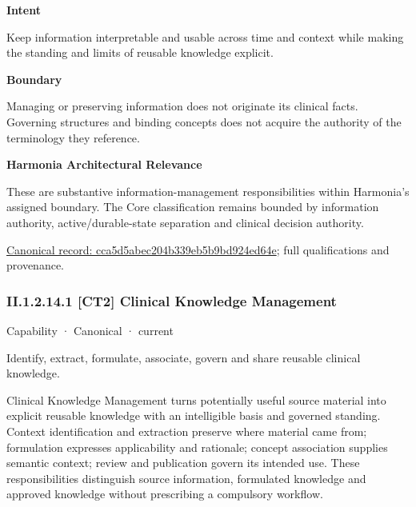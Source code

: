 \textbf{Intent}



Keep information interpretable and usable across time and context while making the standing and limits of reusable knowledge explicit.



\textbf{Boundary}



Managing or preserving information does not originate its clinical facts. Governing structures and binding concepts does not acquire the authority of the terminology they reference.



\textbf{Harmonia Architectural Relevance}



These are substantive information-management responsibilities within Harmonia's assigned boundary. The Core classification remains bounded by information authority, active/durable-state separation and clinical decision authority.


{\footnotesize \href{../../../../continuum/strategy/capability/cca5d5abec204b339eb5b9bd924ed64e.md}{Canonical record: cca5d5abec204b339eb5b9bd924ed64e}; full qualifications and provenance.}\par
\subsubsection*{II.1.2.14.1 [CT2] Clinical Knowledge Management}
\label{navigation:II.1.2.14.1}

\label{element:76b375248aee49aeb5a5044176a688d8}
{\small Capability · Canonical · current}\par

Identify, extract, formulate, associate, govern and share reusable clinical knowledge.



Clinical Knowledge Management turns potentially useful source material into explicit reusable knowledge with an intelligible basis and governed standing. Context identification and extraction preserve where material came from; formulation expresses applicability and rationale; concept association supplies semantic context; review and publication govern its intended use. These responsibilities distinguish source information, formulated knowledge and approved knowledge without prescribing a compulsory workflow.




